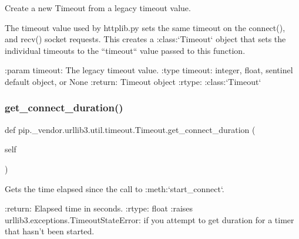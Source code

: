 \begin{DoxyVerb}Create a new Timeout from a legacy timeout value.

The timeout value used by httplib.py sets the same timeout on the
connect(), and recv() socket requests. This creates a :class:`Timeout`
object that sets the individual timeouts to the ``timeout`` value
passed to this function.

:param timeout: The legacy timeout value.
:type timeout: integer, float, sentinel default object, or None
:return: Timeout object
:rtype: :class:`Timeout`
\end{DoxyVerb}
 \mbox{\label{classpip_1_1__vendor_1_1urllib3_1_1util_1_1timeout_1_1Timeout_afddcb98e83bd70962fec705090d0bd98}} 
\subsubsection{\texorpdfstring{get\+\_\+connect\+\_\+duration()}{get\_connect\_duration()}}
{\footnotesize\ttfamily def pip.\+\_\+vendor.\+urllib3.\+util.\+timeout.\+Timeout.\+get\+\_\+connect\+\_\+duration (\begin{DoxyParamCaption}\item[{}]{self }\end{DoxyParamCaption})}

\begin{DoxyVerb}Gets the time elapsed since the call to :meth:`start_connect`.

:return: Elapsed time in seconds.
:rtype: float
:raises urllib3.exceptions.TimeoutStateError: if you attempt
    to get duration for a timer that hasn't been started.
\end{DoxyVerb}
 \mbox{\label{classpip_1_1__vendor_1_1urllib3_1_1util_1_1timeout_1_1Timeout_a80e30330a46f06753000948ee107cc2c}} 
